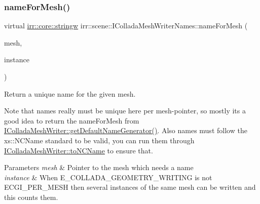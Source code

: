 \subsubsection{\texorpdfstring{name\+For\+Mesh()}{nameForMesh()}\hspace{0.1cm}{\footnotesize\ttfamily [2/2]}}
{\footnotesize\ttfamily virtual \hyperlink{namespaceirr_1_1core_a5aedb62cb47cf01d1c548ab5e6344d2d}{irr\+::core\+::stringw} irr\+::scene\+::\+I\+Collada\+Mesh\+Writer\+Names\+::name\+For\+Mesh (\begin{DoxyParamCaption}\item[{const \hyperlink{classirr_1_1scene_1_1IMesh}{scene\+::\+I\+Mesh} $\ast$}]{mesh,  }\item[{int}]{instance }\end{DoxyParamCaption})\hspace{0.3cm}{\ttfamily [pure virtual]}}



Return a unique name for the given mesh. 

Note that names really must be unique here per mesh-\/pointer, so mostly it\textquotesingle{}s a good idea to return the name\+For\+Mesh from \hyperlink{classirr_1_1scene_1_1IColladaMeshWriter_acd10fcf2458271d59cf76284613288f6}{I\+Collada\+Mesh\+Writer\+::get\+Default\+Name\+Generator()}. Also names must follow the xs\+::\+N\+C\+Name standard to be valid, you can run them through \hyperlink{classirr_1_1scene_1_1IColladaMeshWriter_ac9c48beab095aa6f4cb4f696bb2ecd45}{I\+Collada\+Mesh\+Writer\+::to\+N\+C\+Name} to ensure that. 
\begin{DoxyParams}{Parameters}
{\em mesh} & Pointer to the mesh which needs a name \\
\hline
{\em instance} & When E\+\_\+\+C\+O\+L\+L\+A\+D\+A\+\_\+\+G\+E\+O\+M\+E\+T\+R\+Y\+\_\+\+W\+R\+I\+T\+I\+NG is not E\+C\+G\+I\+\_\+\+P\+E\+R\+\_\+\+M\+E\+SH then several instances of the same mesh can be written and this counts them. \\
\hline
\end{DoxyParams}
\mbox{\label{classirr_1_1scene_1_1IColladaMeshWriterNames_a60d3fdad90edc25b0305c91be15b255f}} 
